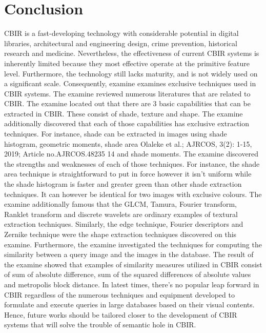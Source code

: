 \chapter{Conclusion}
CBIR  is  a  fast-developing  technology  with considerable  potential  in  digital  libraries, architectural  and  engineering  design,  crime prevention,  historical  research  and  medicine. Nevertheless,  the  effectiveness  of  current  CBIR systems  is  inherently  limited  because  they  most effective operate  at  the  primitive  feature  level. Furthermore,  the  technology  still  lacks  maturity, and  is  not  widely  used  on  a  significant  scale. Consequently,  examine  examines  exclusive techniques  used  in  CBIR  systems.  The  examine reviewed  numerous  literatures  that  are  related  to CBIR.  The  examine  located out  that  there  are  3 basic  capabilities  that  can  be  extracted  in  CBIR. These  consist of  shade,  texture  and  shape.  The examine  additionally  discovered that  each  of  those  capabilities has  exclusive  extraction  techniques.  For  instance, shade  can  be  extracted  in  images  using  shade histogram,  geometric  moments,  shade  area     Olaleke et al.; AJRCOS, 3(2): 1-15, 2019; Article no.AJRCOS.48235    14  and  shade  moments.  The  examine  discovered  the strengths  and  weaknesses  of  each  of  those techniques.  For  instance,  the  shade  area technique is straightforward to put in force however it isn't uniform while  the  shade  histogram  is  faster  and  greater green than  other  shade  extraction  techniques.  It can  however  be  identical  for  two  images  with exclusive colours. The examine additionally famous that  the GLCM,  Tamura,  Fourier  transform,  Ranklet transform  and  discrete  wavelets  are  ordinary examples  of  textural  extraction  techniques. Similarly,  the  edge  technique,  Fourier  descriptors and  Zernike  technique  were  the  shape  extraction techniques discovered  on this examine. Furthermore, the examine  investigated  the techniques  for  computing the  similarity  between  a  query  image  and  the images  in  the  database.  The  result  of  the  examine showed  that  examples  of  similarity  measures utilized in CBIR consist of sum of absolute difference, sum  of  the  squared  differences  of  absolute values and metropolis block distance.  In latest times, there's no popular leap forward in CBIR regardless of the numerous techniques and equipment developed  to  formulate  and  execute  queries  in large  databases  based  on  their  visual  contents. Hence,  future  works  should  be  tailored  closer to the  development  of  CBIR  systems  that  will solve the trouble of semantic hole in CBIR.

